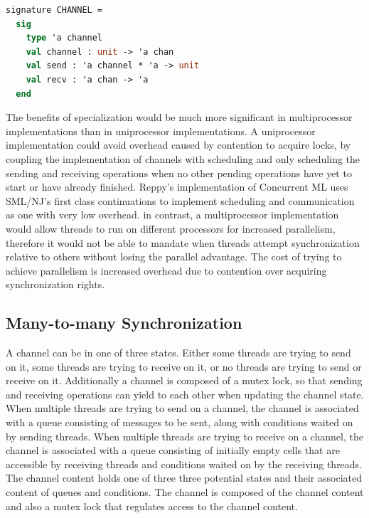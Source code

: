 \documentclass[10pt]{article}
\begin{document}
\begin{lstlisting}[language=ML, mathescape]
  signature CHANNEL =
  sig
    type 'a channel 
    val channel : unit -> 'a chan
    val send : 'a channel * 'a -> unit
    val recv : 'a chan -> 'a
  end     
\end{lstlisting}

The benefits of specialization would be much more significant in multiprocessor
implementations than in uniprocessor implementations. A uniprocessor
implementation could avoid overhead caused by contention to acquire locks, by coupling the
implementation of channels with scheduling and only scheduling the sending and receiving
operations when no other pending operations have yet to start or have already finished.
Reppy's implementation of
Concurrent ML uses SML/NJ's first class continuations to implement scheduling and communication
as one with very low overhead. in contrast, a multiprocessor
implementation would allow threads to run
on different processors for increased parallelism,
therefore it would not be able to mandate when
threads attempt synchronization relative to others without losing the parallel advantage.
The cost of trying to achieve parallelism
is increased overhead due to contention over acquiring
synchronization rights. 



\subsection{Many-to-many Synchronization}
A channel can be in one of three states.  Either some threads are trying to send on it,
some threads are trying to receive on it, or no threads are trying to send or receive on it.
Additionally a channel is composed of a mutex lock,
so that sending and receiving operations can yield
to each other when updating the channel state. When multiple threads are trying to send on a
channel, the channel is associated with a queue consisting of messages to be sent, along with
conditions waited on by sending threads. When multiple threads are trying to receive on a
channel, the channel is associated with a queue consisting of
initially empty cells that are accessible by receiving threads and
conditions waited on by the receiving threads.
The channel content holds one of three three potential states and their
associated content of queues and conditions.
The channel is composed of the channel content and also a mutex lock that regulates access to
the channel content.
\end{document}
